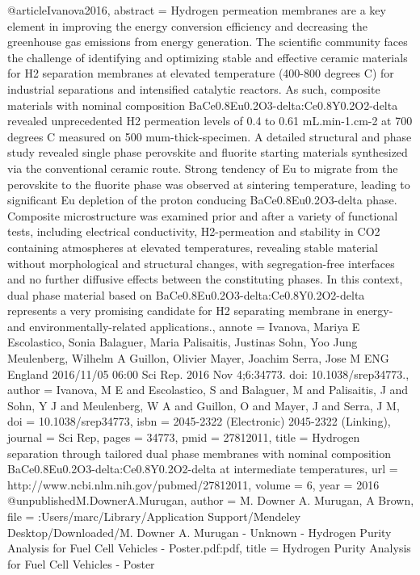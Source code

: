 @article{Ivanova2016,
abstract = {Hydrogen permeation membranes are a key element in improving the energy conversion efficiency and decreasing the greenhouse gas emissions from energy generation. The scientific community faces the challenge of identifying and optimizing stable and effective ceramic materials for H2 separation membranes at elevated temperature (400-800 degrees C) for industrial separations and intensified catalytic reactors. As such, composite materials with nominal composition BaCe0.8Eu0.2O3-delta:Ce0.8Y0.2O2-delta revealed unprecedented H2 permeation levels of 0.4 to 0.61 mL.min-1.cm-2 at 700 degrees C measured on 500 mum-thick-specimen. A detailed structural and phase study revealed single phase perovskite and fluorite starting materials synthesized via the conventional ceramic route. Strong tendency of Eu to migrate from the perovskite to the fluorite phase was observed at sintering temperature, leading to significant Eu depletion of the proton conducing BaCe0.8Eu0.2O3-delta phase. Composite microstructure was examined prior and after a variety of functional tests, including electrical conductivity, H2-permeation and stability in CO2 containing atmospheres at elevated temperatures, revealing stable material without morphological and structural changes, with segregation-free interfaces and no further diffusive effects between the constituting phases. In this context, dual phase material based on BaCe0.8Eu0.2O3-delta:Ce0.8Y0.2O2-delta represents a very promising candidate for H2 separating membrane in energy- and environmentally-related applications.},
annote = {Ivanova, Mariya E
Escolastico, Sonia
Balaguer, Maria
Palisaitis, Justinas
Sohn, Yoo Jung
Meulenberg, Wilhelm A
Guillon, Olivier
Mayer, Joachim
Serra, Jose M
ENG
England
2016/11/05 06:00
Sci Rep. 2016 Nov 4;6:34773. doi: 10.1038/srep34773.},
author = {Ivanova, M E and Escolastico, S and Balaguer, M and Palisaitis, J and Sohn, Y J and Meulenberg, W A and Guillon, O and Mayer, J and Serra, J M},
doi = {10.1038/srep34773},
isbn = {2045-2322 (Electronic)
2045-2322 (Linking)},
journal = {Sci Rep},
pages = {34773},
pmid = {27812011},
title = {{Hydrogen separation through tailored dual phase membranes with nominal composition BaCe0.8Eu0.2O3-delta:Ce0.8Y0.2O2-delta at intermediate temperatures}},
url = {http://www.ncbi.nlm.nih.gov/pubmed/27812011},
volume = {6},
year = {2016}
}
@unpublished{M.DownerA.Murugan,
author = {{M. Downer  A. Murugan}, A Brown},
file = {:Users/marc/Library/Application Support/Mendeley Desktop/Downloaded/M. Downer A. Murugan - Unknown - Hydrogen Purity Analysis for Fuel Cell Vehicles - Poster.pdf:pdf},
title = {{Hydrogen Purity Analysis for Fuel Cell Vehicles - Poster}}
}
